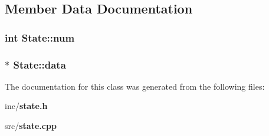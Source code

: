\subsection{Member Data Documentation}
\subsubsection{\setlength{\rightskip}{0pt plus 5cm}int {\bf State::num}}\label{classState_2091da71db2bcf6df658fd16c905c716}


\subsubsection{$\ast$ {\bf State::data}}\label{classState_0f5a8a0a362d302a11e5ee1396e876b3}




The documentation for this class was generated from the following files:\begin{CompactItemize}
\item 
inc/{\bf state.h}\item 
src/{\bf state.cpp}\end{CompactItemize}
